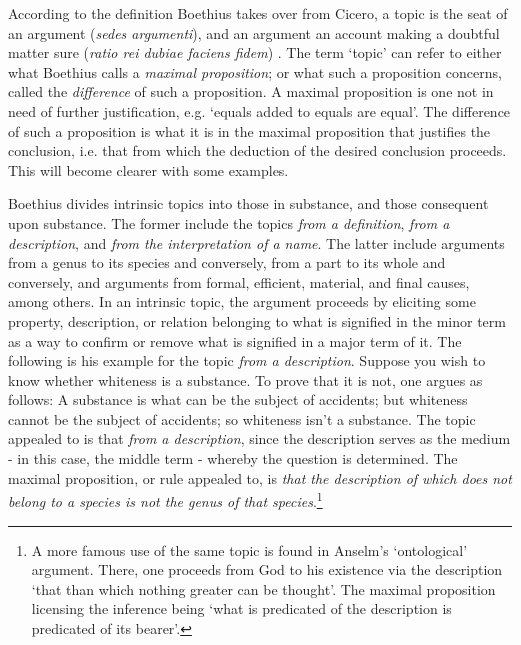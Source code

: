 \documentclass[]{article}
\begin{document}
According to the definition Boethius takes over from Cicero, a topic is the seat of an argument (\textit{sedes argumenti}), and an argument an account making a doubtful matter sure (\textit{ratio rei dubiae faciens fidem}) \cite[I]{BDT}. The term `topic' can refer to either what Boethius calls a \textit{maximal proposition}; or what such a proposition concerns, called the \textit{difference} of such a proposition. A maximal proposition is one not in need of further justification, e.g. `equals added to equals are equal'. The difference of such a proposition is what it is in the maximal proposition that justifies the conclusion, i.e. that from which the deduction of the desired conclusion proceeds. This will become clearer with some examples.

Boethius divides intrinsic topics into those in substance, and those consequent upon substance. The former include the topics \textit{from a definition}, \textit{from a description}, and \textit{from the interpretation of a name}. The latter include arguments from a genus to its species and conversely, from a part to its whole and conversely, and arguments from formal, efficient, material, and final causes, among others. In an intrinsic topic, the argument proceeds by eliciting some property, description, or relation belonging to what is signified in the minor term as a way to confirm or remove what is signified in a major term of it. The following is his example for the topic \textit{from a description}. Suppose you wish to know whether whiteness is a substance. To prove that it is not, one argues as follows: A substance is what can be the subject of accidents; but whiteness cannot be the subject of accidents; so whiteness isn't a substance. The topic appealed to is that \textit{from a description}, since the description serves as the medium - in this case, the middle term - whereby the question is determined. The maximal proposition, or rule appealed to, is \textit{that the description of which does not belong to a species is not the genus of that species}.\footnote{A more famous use of the same topic is found in Anselm's `ontological' argument. There, one proceeds from God to his existence via the description `that than which nothing greater can be thought'. The maximal proposition licensing the inference being `what is predicated of the description is predicated of its bearer'.}
\end{document}
